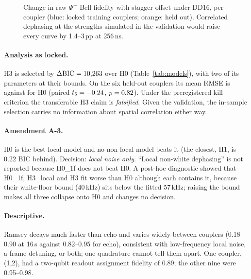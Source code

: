 \documentclass[10pt,twocolumn]{article}
\begin{document}
\begin{figure}[t]
\centering
{}
\caption{Change in raw $\Phi^+$ Bell fidelity with stagger offset under DD16, per coupler (blue:
locked training couplers; orange: held out). Correlated dephasing at the strengths simulated in
the validation would raise every curve by 1.4--3\,pp at 256\,ns.}
\label{fig:stagger}
\end{figure}

\paragraph{Analysis as locked.} H3 is selected by $\Delta\mathrm{BIC}=10{,}263$ over H0
(Table~\ref{tab:models}), with two of its parameters at their bounds. On the six held-out couplers its
mean RMSE is \HoRmseHThree{} against \HoRmseHZero{} for H0 (paired $t_5=-0.24$, $p=0.82$). Under the
preregistered kill criterion the transferable H3 claim is \emph{falsified}. Given the validation,
the in-sample selection carries no information about spatial correlation either way.

\paragraph{Amendment A-3.} H0 is the best local model and no non-local model beats it (the closest,
H1, is 0.22 BIC behind). Decision: \emph{local noise only}. ``Local non-white dephasing'' is not
reported because H0\_1f does not beat H0. A post-hoc diagnostic showed that H0\_1f, H3\_local and H3
fit worse than H0 although each contains it, because their white-floor bound (40\,kHz) sits below the
fitted 57\,kHz; raising the bound makes all three collapse onto H0 and changes no decision.

\paragraph{Descriptive.} Ramsey decays much faster than echo and varies widely between couplers (0.18--0.90
at 16\,\textmu s against 0.82--0.95 for echo), consistent with low-frequency local noise, a frame
detuning, or both; one quadrature cannot tell them apart. One coupler, (1,2), had a two-qubit readout
assignment fidelity of 0.89; the other nine were 0.95--0.98.
\end{document}
